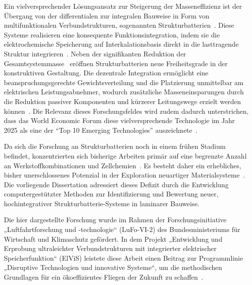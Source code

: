 Ein vielversprechender Lösungsansatz zur Steigerung der Masseneffizienz ist der Übergang von der differentialen zur integralen Bauweise in Form von multifunktionalen Verbundstrukturen, sogenannten Strukturbatterien~\cite{Johannisson2018, Liu2009, Ekstedt2010, Wang2019, Zhao2020, Yin2020, Lutkenhaus2020, Fu2021, Jin2021, Kalnaus2021}. Diese Systeme realisieren eine konsequente Funktionsintegration, indem sie die elektrochemische Speicherung auf Interkalationsbasis direkt in die lasttragende Struktur integrieren~\cite{Wong2007, Carlson2013}. Neben der signifikanten Reduktion der Gesamtsystemmasse~\cite{Wetzel2004, Snyder2015, Carlstedt2020a, Asp2014, Johannisson2019} eröffnen Strukturbatterien neue Freiheitsgrade in der konstruktiven Gestaltung. Die dezentrale Integration ermöglicht eine beanspruchungsgerechte Gewichtsverteilung und die Platzierung unmittelbar am elektrischen Leistungsabnehmer, wodurch zusätzliche Masseneinsparungen durch die Reduktion passiver Komponenten und kürzerer Leitungswege erzielt werden können~\cite{Thomas2004, Danzi2021, Moyer2020, Wang2020}. Die Relevanz dieses Forschungsfeldes wird zudem dadurch unterstrichen, dass das World Economic Forum diese vielversprechende Technologie im Jahr 2025 als eine der "`Top 10 Emerging Technologies"' auszeichnete~\cite{WEF2025EmergingTech}.


Da sich die Forschung an Strukturbatterien noch in einem frühen Stadium befindet, konzentrierten sich bisherige Arbeiten primär auf eine begrenzte Anzahl an Werkstoffkombinationen und Zellchemien~\cite{Asp2019, Asp2024}. Es besteht daher ein erhebliches, bisher unerschlossenes Potenzial in der Exploration neuartiger Materialsysteme~\cite{Asp2019, Snyder2006, Chen2024a}. Die vorliegende Dissertation adressiert dieses Defizit durch die Entwicklung computergestützter Methoden zur Identifizierung und Bewertung neuer, hochintegrativer Strukturbatterie-Systeme in laminarer Bauweise.

Die hier dargestellte Forschung wurde im Rahmen der Forschungsinitiative „Luftfahrtforschung und -technologie“ (LuFo-VI-2) des Bundesministeriums für Wirtschaft und Klimaschutz gefördert. In dem Projekt „Entwicklung und Erprobung ultraleichter Verbundstrukturen mit integrierter elektrischer Speicherfunktion“ (ElViS) leistete diese Arbeit einen Beitrag zur Programmlinie „Disruptive Technologien und innovative Systeme“, um die methodischen Grundlagen für ein ökoeffizientes Fliegen der Zukunft zu schaffen~\cite{Scholz2018}.

